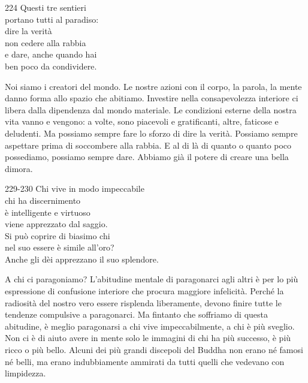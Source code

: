 
\begin{dhpVerse}{224}
\label{dhp-224}
Questi tre sentieri\\
portano tutti al paradiso:\\
dire la verità\\
non cedere alla rabbia\\
e dare, anche quando hai\\
ben poco da condividere.
\end{dhpVerse}

\begin{dhpRefl}
  Noi siamo i creatori del mondo. Le nostre azioni con il corpo, la parola, la
  mente danno forma allo spazio che abitiamo. Investire nella consapevolezza
  interiore ci libera dalla dipendenza dal mondo materiale. Le condizioni
  esterne della nostra vita vanno e vengono: a volte, sono piacevoli e
  gratificanti, altre, faticose e deludenti. Ma possiamo sempre fare lo sforzo
  di dire la verità. Possiamo sempre aspettare prima di soccombere alla rabbia.
  E al di là di quanto o quanto poco possediamo, possiamo sempre dare. Abbiamo
  già il potere di creare una bella dimora.
\end{dhpRefl}


\begin{dhpVerse}{229-230}
\label{dhp-229}\label{dhp-230}
Chi vive in modo impeccabile\\
chi ha discernimento\\
è intelligente e virtuoso\\
viene apprezzato dal saggio.\\
Si può coprire di biasimo chi\\
nel suo essere è simile all'oro?\\
Anche gli dèi apprezzano il suo splendore.
\end{dhpVerse}

\begin{dhpRefl}
  A chi ci paragoniamo? L'abitudine mentale di paragonarci agli altri è per lo
  più espressione di confusione interiore che procura maggiore infelicità.
  Perché la radiosità del nostro vero essere risplenda liberamente, devono
  finire tutte le tendenze compulsive a paragonarci. Ma fintanto che soffriamo
  di questa abitudine, è meglio paragonarsi a chi vive impeccabilmente, a chi è
  più sveglio. Non ci è di aiuto avere in mente solo le immagini di chi ha più
  successo, è più ricco o più bello. Alcuni dei più grandi discepoli del Buddha
  non erano né famosi né belli, ma erano indubbiamente ammirati da tutti quelli
  che vedevano con limpidezza.
\end{dhpRefl}

